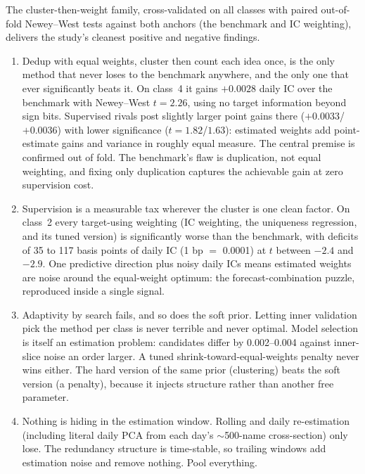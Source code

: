 \documentclass[11pt]{article}
\begin{document}
The cluster-then-weight family, cross-validated on all classes with paired out-of-fold
Newey--West tests against both anchors (the benchmark and IC weighting), delivers the
study's cleanest positive and negative findings.

\begin{enumerate}
\item Dedup with equal weights, cluster then count each idea once, is the only method that
      never loses to the benchmark anywhere, and the only one that ever significantly
      beats it. On class~4 it gains $+0.0028$ daily IC over the benchmark with
      Newey--West $t=2.26$, using no target information beyond sign bits. Supervised
      rivals post slightly larger point gains there ($+0.0033$/$+0.0036$) with lower
      significance ($t=1.82$/$1.63$): estimated weights add point-estimate gains and
      variance in roughly equal measure. The central premise is confirmed out of fold.
      The benchmark's flaw is duplication, not equal weighting, and fixing only
      duplication captures the achievable gain at zero supervision cost.
\item Supervision is a measurable tax wherever the cluster is one clean factor.
      On class~2 every target-using weighting (IC weighting, the uniqueness regression,
      and its tuned version) is significantly worse than the benchmark, with deficits of
      35 to 117 basis points of daily IC (1 bp $=$ 0.0001) at $t$ between $-2.4$ and
      $-2.9$. One predictive direction plus noisy daily ICs means estimated weights are
      noise around the equal-weight optimum: the forecast-combination puzzle, reproduced
      inside a single signal.
\item Adaptivity by search fails, and so does the soft prior. Letting inner validation
      pick the method per class is never terrible and never optimal. Model selection is itself an
      estimation problem: candidates differ by 0.002--0.004 against inner-slice noise an
      order larger. A tuned shrink-toward-equal-weights penalty never wins
      either. The hard version of the same prior (clustering) beats the soft version
      (a penalty), because it injects structure rather than another free parameter.
\item Nothing is hiding in the estimation window. Rolling and daily re-estimation
      (including literal daily PCA from each day's $\sim$500-name cross-section) only
      lose. The redundancy structure is time-stable, so trailing windows add estimation
      noise and remove nothing. Pool everything.
\end{enumerate}
\end{document}
